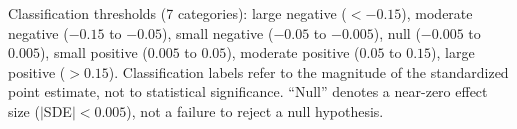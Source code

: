 \begin{table}[H]
{Classification thresholds (7 categories): large negative ($< -0.15$), moderate negative ($-0.15$ to $-0.05$), small negative ($-0.05$ to $-0.005$), null ($-0.005$ to $0.005$), small positive ($0.005$ to $0.05$), moderate positive ($0.05$ to $0.15$), large positive ($> 0.15$). Classification labels refer to the magnitude of the standardized point estimate, not to statistical significance. ``Null'' denotes a near-zero effect size ($|$SDE$| < 0.005$), not a failure to reject a null hypothesis.}
\end{table}
